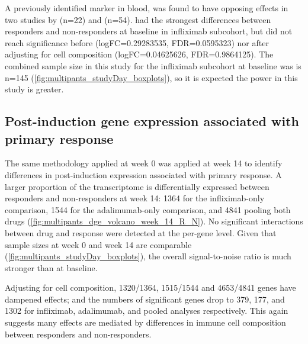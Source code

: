 A previously identified marker in blood,  was found to have opposing effects in two studies by \textcite{gaujoux2019CellcentredMetaanalysisReveals} (n=22) and \textcite{verstockt2019LowTREM1Expression} (n=54).
 had the strongest differences between responders and non-responders at baseline in infliximab subcohort, 
but did not reach significance before (logFC=\num{0.29283535}, FDR=\num{0.0595323})
nor after adjusting for cell composition (logFC=\num{0.04625626}, FDR=\num{0.9864125}).
The combined sample size in this study for the infliximab subcohort at baseline was is n=145 (\cref{fig:multipants_studyDay_boxplots}), so it is expected the power in this study is greater.



\subsection{Post-induction gene expression associated with primary response}

The same methodology applied at week 0 was applied at week 14 to identify differences in post-induction expression associated with primary response.
A larger proportion of the transcriptome is differentially expressed between responders and non-responders at week 14: 
1364 for the infliximab-only comparison, 
1544 for the adalimumab-only comparison, 
and 4841 pooling both drugs (\cref{fig:multipants_dge_volcano_week_14_R_N}).
No significant interactions between drug and response were detected at the per-gene level.
Given that sample sizes at week 0 and week 14 are comparable (\cref{fig:multipants_studyDay_boxplots}), the overall signal-to-noise ratio is much stronger than at baseline.

Adjusting for cell composition, 1320/1364, 1515/1544 and 4653/4841 genes have dampened effects;
and the numbers of significant genes drop to 379, 177, and 1302 for infliximab, adalimumab, and pooled analyses respectively.
This again suggests many effects are mediated by differences in immune cell composition between responders and non-responders.

